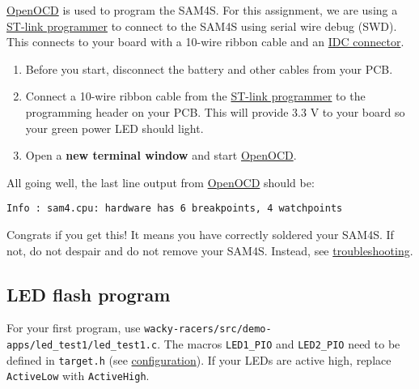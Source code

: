 \url{OpenOCD} is used to program the SAM4S. For this assignment, we are
using a \href{ST-link_programmer}{ST-link programmer} to connect to the
SAM4S using serial wire debug (SWD). This connects to your board with a
10-wire ribbon cable and an \href{IDC_connector}{IDC connector}.

\begin{enumerate}
\item
  Before you start, disconnect the battery and other cables from your
  PCB.
\item
  Connect a 10-wire ribbon cable from the
  \href{ST-link_programmer}{ST-link programmer} to the programming
  header on your PCB. This will provide 3.3 V to your board so your
  green power LED should light.
\item
  Open a \textbf{new terminal window} and start \url{OpenOCD}.
\end{enumerate}

\begin{Shaded}
\begin{Highlighting}[]
\end{Highlighting}
\end{Shaded}

All going well, the last line output from \url{OpenOCD} should be:

\begin{verbatim}
Info : sam4.cpu: hardware has 6 breakpoints, 4 watchpoints
\end{verbatim}

Congrats if you get this! It means you have correctly soldered your
SAM4S. If not, do not despair and do not remove your SAM4S. Instead,
see \protect\hyperref[troubleshooting]{troubleshooting}.


\subsection{LED flash program}
\label{led-flash-program}

For your first program, use
\texttt{wacky-racers/src/demo-apps/led\_test1/led\_test1.c}. The macros
\texttt{LED1\_PIO} and \texttt{LED2\_PIO} need to be defined in
\texttt{target.h} (see
\protect\hyperref[configuration]{configuration}). If your LEDs are
active high, replace \texttt{ActiveLow} with \texttt{ActiveHigh}.


